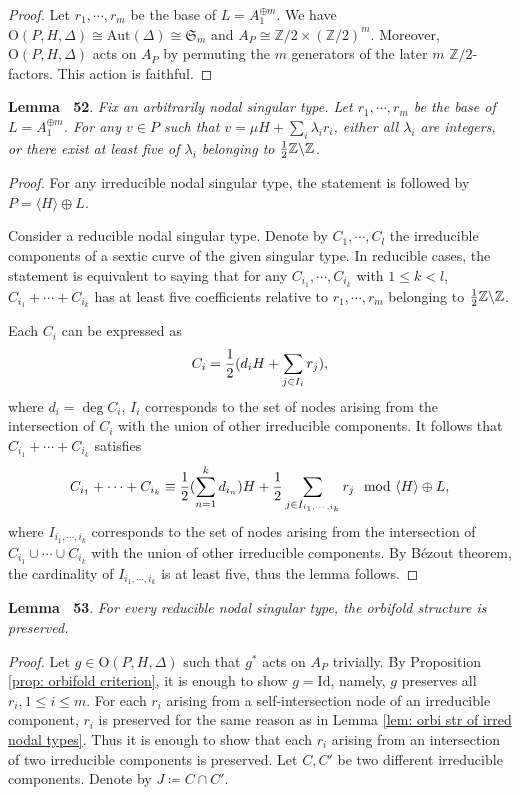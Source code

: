 \documentclass[
]{article}
\begin{document}
\emph{Proof.} Let \(r_1,\cdots,r_m\) be the base of
\(L=A_1^{\oplus m}\). We have
\(\mathrm{O}(P,H,\Delta)\cong\mathrm{Aut}(\Delta)\cong\mathfrak{S}_m\)
and \(A_P\cong\mathbb{Z}/2\times(\mathbb{Z}/2)^m\). Moreover,
\(\mathrm{O}(P,H,\Delta)\) acts on \(A_P\) by permuting the \(m\)
generators of the later \(m\) \(\mathbb{Z}/2\)-factors. This action is
faithful.~◻

\textbf{Lemma~ 52}. \emph{\label{lem: 0 or >=5} Fix an arbitrarily nodal
singular type. Let \(r_1,\cdots,r_m\) be the base of
\(L=A_1^{\oplus m}\). For any \(v\in P\) such that
\(v=\mu H+\sum\limits_i \lambda_i r_i\), either all \(\lambda_i\) are
integers, or there exist at least five of \(\lambda_i\) belonging to
\({1\over2}\mathbb{Z}\backslash\mathbb{Z}\).}

\emph{Proof.} For any irreducible nodal singular type, the statement is
followed by \(P=\langle H\rangle\oplus L\).

Consider a reducible nodal singular type. Denote by \(C_1,\cdots,C_l\)
the irreducible components of a sextic curve of the given singular type.
In reducible cases, the statement is equivalent to saying that for any
\(C_{i_1},\cdots,C_{i_k}\) with \(1\le k<l\), \(C_{i_1}+\cdots+C_{i_k}\)
has at least five coefficients relative to \(r_1,\cdots,r_m\) belonging
to \({1\over2}\mathbb{Z}\backslash\mathbb{Z}\).

Each \(C_i\) can be expressed as
\[C_i = {1\over2}(d_i H + \sum_{j\in I_i}r_j),\] where \(d_i=\deg C_i\),
\(I_i\) corresponds to the set of nodes arising from the intersection of
\(C_i\) with the union of other irreducible components. It follows that
\(C_{i_1}+\cdots+C_{i_k}\) satisfies
\[C_{i_1}+\cdots+C_{i_k} \equiv {1\over2}(\sum_{n=1}^k d_{i_n})H + {1\over2}\sum_{j\in I_{i_1,\cdots,i_k}} r_j \mod \langle H\rangle\oplus L,\]
where \(I_{i_1,\cdots,i_k}\) corresponds to the set of nodes arising
from the intersection of \(C_{i_1}\cup\cdots\cup C_{i_k}\) with the
union of other irreducible components. By Bézout theorem, the
cardinality of \(I_{i_1,\cdots,i_k}\) is at least five, thus the lemma
follows.~◻

\textbf{Lemma~ 53}. \emph{\label{lem: orbi str of reducible types} For
every reducible nodal singular type, the orbifold structure is
preserved.}

\emph{Proof.} Let \(g\in\mathrm{O}(P,H,\Delta)\) such that \(g^*\) acts
on \(A_P\) trivially. By Proposition \ref{prop: orbifold criterion}, it
is enough to show \(g=\mathrm{Id}\), namely, \(g\) preserves all
\(r_i, 1\le i\le m\). For each \(r_i\) arising from a self-intersection
node of an irreducible component, \(r_i\) is preserved for the same
reason as in Lemma \ref{lem: orbi str of irred nodal types}. Thus it is
enough to show that each \(r_i\) arising from an intersection of two
irreducible components is preserved. Let \(C,C'\) be two different
irreducible components. Denote by \(J\coloneqq C\cap C'\).
\end{document}
